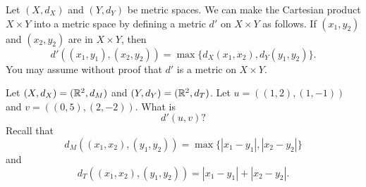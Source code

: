 {\begin{comment}
\item Let $p$ be a prime and let $a$ and $b$ be integers. Since $p$ is prime, $p^t$ is positive for any real integer $t$. Thus, $d(a,b) \geq 0$. 

If $a=b$, then $d(a,b) = 0 = d(b,a)$. If $a \neq b$, then $a-b = k \times p^t$ and $b-a = (-k) \times p^t$. Then $d(a,b) = \frac{1}{p^t} = d(b,a)$. so $d$ is symmetric.

If $a = b$, then $d(a,b) = 0$ by definition. Now suppose that $d(a,b) = 0$. If $a \neq b$, then $d(a,b) = \frac{1}{p^t} \neq 0$, which is a contradiction. Therefore, $a = b$. We conclude that $d(a,b) = 0$ if and only if $a=b$. 

Finally, we verify the triangle inequality. Let $c \in \Z$.  If $a = b$, then 
\[d(a,b) = 0 \leq d(a,c) + d(c,b).\]
So assume $a \neq b$. If $c = a$, then 
\[d(a,b) = 0 + d(a,b) = d(a,c) + d(c,b)\]
and if $c = b$, then 
\[d(a,b) = d(a,b) + 0 = d(a,c) + d(c,b).\]
So we can assume that $a$, $b$, and $c$ are three distinct integers. Let $m = \min\{t(a,b), t(b,c)\}$. Note that if $m \leq n$ for some nonnegative integer $n$, then $p^m \leq p^n$ and $\frac{1}{p^m} \geq \frac{1}{p^n}$. From (a) we know that $m \leq t(a,c)$, so we have 
\[d(a,b) + d(b,c) = \frac{1}{p^{t(a,b)}} + \frac{1}{p^{t(b,c)}} \geq \frac{1}{p^m} \geq \frac{1}{p^{t(a,c)}} = d(a,c).\]

\item Let $p=3$ and let $a \in \Z$ such that $d(a,0) = 1$. Then $a = a-0 = k \times p^1$ for some integer $k$. So the set of integers $a$ such that $d(a,0) = 1$ are all of the integers of the form $kp$ where $\gcd(k,p) = 1$.  

\item Note that $t(a,b)$ is always a nonnegative integer. So if $d(a,0) < \frac{1}{2}$, then $d(a,0) = 0$. This is the set of all integers relatively prime to $p$. 

\ea


\end{comment}



\item Let $(X, d_X)$ and $(Y, d_Y)$ be metric spaces. We can make the Cartesian product $X \times Y$ into a metric space by defining a metric $d'$ on $X \times Y$ as follows. If $(x_1, y_2)$ and $(x_2, y_2)$ are in $X \times Y$, then 
	\[d'((x_1,y_1), (x_2, y_2)) = \max\{d_X(x_1,x_2), d_Y(y_1,y_2)\}.\]
You may assume without proof that $d'$ is a metric on $X \times Y$. 

\ba
\item Let $(X, d_X) = (\mathbb{R}^2, d_M)$ and $(Y, d_Y) = (\mathbb{R}^2, d_T)$. Let $u = ((1,2), (1,-1))$ and $v = ((0,5),(2,-2))$. What is 
\[d'(u,v)?\]
Recall that 
\[d_M((x_1,x_2),(y_1,y_2)) = \max\{ | x_1-y_1 |, | x_2-y_2 |\}\]
and
\[d_T((x_1,x_2),(y_1,y_2)) = | x_1-y_1 | + | x_2-y_2 |.\]
		
}
